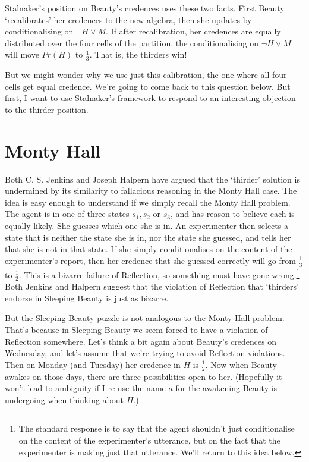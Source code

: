 Stalnaker's position on Beauty's credences uses these two facts. First Beauty `recalibrates' her credences to the new algebra, then she updates by conditionalising on \(\neg H \vee M\). If after recalibration, her credences are equally distributed over the four cells of the partition, the conditionalising on \(\neg H \vee M\) will move \(Pr(H)\) to \(\frac{1}{3}\). That is, the thirders win!

But we might wonder why we use just this calibration, the one where all four cells get equal credence. We're going to come back to this question below. But first, I want to use Stalnaker's framework to respond to an interesting objection to the thirder position.

\section{Monty Hall}
Both C. S. Jenkins \citeyearpar{Jenkins2005} and Joseph Halpern \citeyearpar{Halpern2004} have argued that the `thirder' solution is undermined by its similarity to fallacious reasoning in the Monty Hall case. The idea is easy enough to understand if we simply recall the Monty Hall problem. The agent is in one of three states \(s_1, s_2\) or \(s_3\), and has reason to believe each is equally likely. She guesses which one she is in. An experimenter then selects a state that is neither the state she is in, nor the state she guessed, and tells her that she is not in that state. If she simply conditionalises on the content of the experimenter's report, then her credence that she guessed correctly will go from \(\frac{1}{3}\) to \(\frac{1}{2}\). This is a bizarre failure of Reflection, so something must have gone wrong.\footnote{The standard response is to say that the agent shouldn't just conditionalise on the content of the experimenter's utterance, but on the fact that the experimenter is making just that utterance. We'll return to this idea below.} Both Jenkins and Halpern suggest that the violation of Reflection that `thirders' endorse in Sleeping Beauty is just as bizarre.

But the Sleeping Beauty puzzle is not analogous to the Monty Hall problem. That's because in Sleeping Beauty we seem forced to have a violation of Reflection somewhere. Let's think a bit again about Beauty's credences on Wednesday, and let's assume that we're trying to avoid Reflection violations. Then on Monday (and Tuesday) her credence in \(H\) is \(\frac{1}{2}\). Now when Beauty awakes on those days, there are three possibilities open to her. (Hopefully it won't lead to ambiguity if I re-use the name \(a\) for the awakening Beauty is undergoing when thinking about \(H\).)

